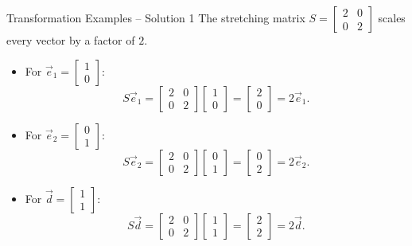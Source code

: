 \documentclass{beamer}
\begin{document}
\begin{frame}{Transformation Examples -- Solution 1}
  The stretching matrix \(S = \begin{bmatrix} 2 & 0 \\ 0 & 2 \end{bmatrix}\) scales every vector by a factor of \(2\).
  \begin{itemize}
    \item For \(\vec{e}_1 = \begin{bmatrix} 1 \\ 0 \end{bmatrix}\):
    \begin{equation}
      S\vec{e}_1 = \begin{bmatrix} 2 & 0 \\ 0 & 2 \end{bmatrix}\begin{bmatrix} 1 \\ 0 \end{bmatrix} = \begin{bmatrix} 2 \\ 0 \end{bmatrix} = 2\vec{e}_1.
    \end{equation}
    \item For \(\vec{e}_2 = \begin{bmatrix} 0 \\ 1 \end{bmatrix}\):
    \begin{equation}
      S\vec{e}_2 = \begin{bmatrix} 2 & 0 \\ 0 & 2 \end{bmatrix}\begin{bmatrix} 0 \\ 1 \end{bmatrix} = \begin{bmatrix} 0 \\ 2 \end{bmatrix} = 2\vec{e}_2.
    \end{equation}
    \item For \(\vec{d} = \begin{bmatrix} 1 \\ 1 \end{bmatrix}\):
    \begin{equation}
      S\vec{d} = \begin{bmatrix} 2 & 0 \\ 0 & 2 \end{bmatrix}\begin{bmatrix} 1 \\ 1 \end{bmatrix} = \begin{bmatrix} 2 \\ 2 \end{bmatrix} = 2\vec{d}.
    \end{equation}
  \end{itemize}
\end{frame}
\end{document}
